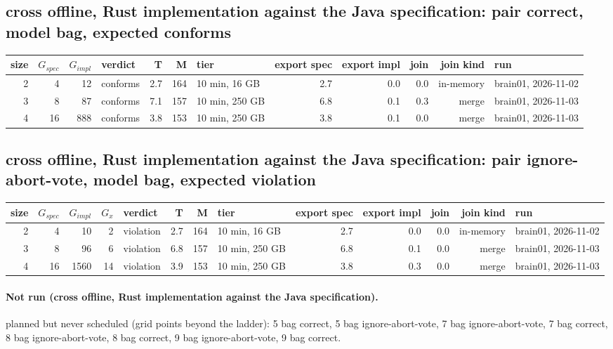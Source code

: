 \documentclass[10pt]{article}
\begin{document}
\subsection*{cross offline, Rust implementation against the Java specification: pair \textsf{correct}, model bag, expected conforms}
\begin{longtable}{@{}rrrlrrlrrrrl@{}}
\toprule
size & $G_{\mathit{spec}}$ & $G_{\mathit{impl}}$ & verdict & T & M & tier & export spec & export impl & join & join kind & run \\
\midrule
\endhead
\color{red} 2 & 4 & 12 & conforms & 2.7 & 164 & 10 min, 16 GB & 2.7 & 0.0 & 0.0 & in-memory & brain01, 2026-11-02 \\
\color{blue} 3 & 8 & 87 & conforms & 7.1 & 157 & 10 min, 250 GB & 6.8 & 0.1 & 0.3 & merge & brain01, 2026-11-03 \\
\color{blue} 4 & 16 & 888 & conforms & 3.8 & 153 & 10 min, 250 GB & 3.8 & 0.1 & 0.0 & merge & brain01, 2026-11-03 \\
\bottomrule
\end{longtable}
\subsection*{cross offline, Rust implementation against the Java specification: pair \textsf{ignore-abort-vote}, model bag, expected violation}
\begin{longtable}{@{}rrrrlrrlrrrrl@{}}
\toprule
size & $G_{\mathit{spec}}$ & $G_{\mathit{impl}}$ & $G_x$ & verdict & T & M & tier & export spec & export impl & join & join kind & run \\
\midrule
\endhead
\color{red} 2 & 4 & 10 & 2 & violation & 2.7 & 164 & 10 min, 16 GB & 2.7 & 0.0 & 0.0 & in-memory & brain01, 2026-11-02 \\
\color{blue} 3 & 8 & 96 & 6 & violation & 6.8 & 157 & 10 min, 250 GB & 6.8 & 0.1 & 0.0 & merge & brain01, 2026-11-03 \\
\color{blue} 4 & 16 & 1560 & 14 & violation & 3.9 & 153 & 10 min, 250 GB & 3.8 & 0.3 & 0.0 & merge & brain01, 2026-11-03 \\
\bottomrule
\end{longtable}
\paragraph{Not run (cross offline, Rust implementation against the Java specification).}
planned but never scheduled (grid points beyond the ladder): 5 bag correct, 5 bag ignore-abort-vote, 7 bag ignore-abort-vote, 7 bag correct, 8 bag ignore-abort-vote, 8 bag correct, 9 bag ignore-abort-vote, 9 bag correct.\par
\end{document}
